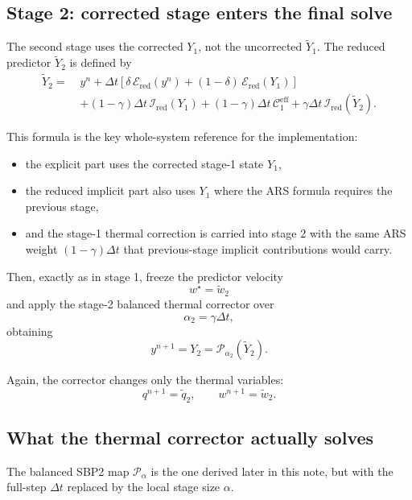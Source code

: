 \documentclass[11pt]{article}
\begin{document}
\subsection{Stage 2: corrected stage enters the final solve}

The second stage uses the corrected $Y_1$, not the uncorrected
$\widetilde Y_1$. The reduced predictor $\widetilde Y_2$ is defined by
\begin{align}
\widetilde Y_2
=\;&
y^n
+
\Delta t\left[
\delta\,\mathcal E_{\mathrm{red}}(y^n)
+
(1-\delta)\,\mathcal E_{\mathrm{red}}(Y_1)
\right]
\nonumber\\
&+
(1-\gamma)\Delta t\,
\mathcal I_{\mathrm{red}}(Y_1)
+
(1-\gamma)\Delta t\,
\mathcal C_1^{\mathrm{eff}}
+
\gamma \Delta t\,
\mathcal I_{\mathrm{red}}(\widetilde Y_2).
\label{eq:stage2-predictor}
\end{align}

This formula is the key whole-system reference for the implementation:
\begin{itemize}
\item the explicit part uses the corrected stage-1 state $Y_1$,
\item the reduced implicit part also uses $Y_1$ where the ARS formula requires
  the previous stage,
\item and the stage-1 thermal correction is carried into stage 2 with the same
  ARS weight $(1-\gamma)\Delta t$ that previous-stage implicit contributions
  would carry.
\end{itemize}

Then, exactly as in stage 1, freeze the predictor velocity
\[
w^\star = \widetilde w_2
\]
and apply the stage-2 balanced thermal corrector over
\[
\alpha_2 = \gamma \Delta t,
\]
obtaining
\begin{equation}
y^{n+1} = Y_2 = \mathcal P_{\alpha_2}(\widetilde Y_2).
\label{eq:stage2-corrector}
\end{equation}

Again, the corrector changes only the thermal variables:
\[
q^{n+1} = \widetilde q_2,
\qquad
w^{n+1} = \widetilde w_2.
\]

\subsection{What the thermal corrector actually solves}

The balanced SBP2 map $\mathcal P_\alpha$ is the one derived later in this
note, but with the full-step $\Delta t$ replaced by the local stage size
$\alpha$.
\end{document}
